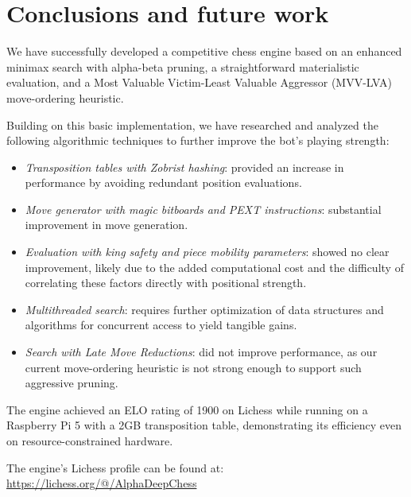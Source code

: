 \chapter{Conclusions and future work}

We have successfully developed a competitive chess engine based on an enhanced minimax search with alpha-beta pruning, a straightforward materialistic evaluation, and a Most Valuable Victim-Least Valuable Aggressor (MVV-LVA) move-ordering heuristic.

\vspace{1em}

\noindent Building on this basic implementation, we have researched and analyzed the following algorithmic techniques to further improve the bot's playing strength:

\begin{itemize}[itemsep=1pt]
    \item \textit{Transposition tables with Zobrist hashing}: provided an increase in performance by avoiding redundant position evaluations.
    \item \textit{Move generator with magic bitboards and PEXT instructions}: substantial improvement in move generation.
    
    \item \textit{Evaluation with king safety and piece mobility parameters}: showed no clear improvement, likely due to the added computational cost and the difficulty of correlating these factors directly with positional strength.
    \item \textit{Multithreaded search}: requires further optimization of data structures and algorithms for concurrent access to yield tangible gains.
    \item \textit{Search with Late Move Reductions}: did not improve performance, as our current move-ordering heuristic is not strong enough to support such aggressive pruning.
\end{itemize}

\noindent The engine achieved an ELO rating of 1900 on Lichess while running on a Raspberry Pi 5 with a 2GB transposition table, demonstrating its efficiency even on resource-constrained hardware.

\vspace{1em}

\noindent The engine's Lichess profile can be found at:\\
\url{https://lichess.org/@/AlphaDeepChess}

\vspace{1em}

